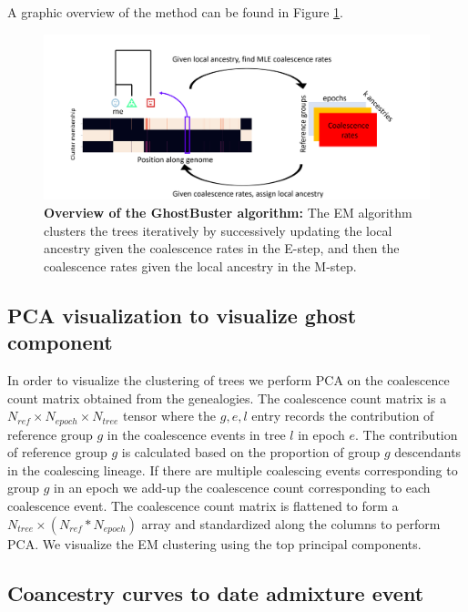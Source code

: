 A graphic overview of the method can be found in Figure \ref{fig:gb_overview}.

\begin{figure}[h!]
    \centering
    \includegraphics[scale=0.5]{figures/ghostbuster_method.PNG}
    \caption{\textbf{Overview of the GhostBuster algorithm: }The EM algorithm clusters the trees iteratively by successively updating the local ancestry given the coalescence rates in the E-step, and then the coalescence rates given the local ancestry in the M-step. }
    \label{fig:gb_overview}
\end{figure}


\subsection{PCA visualization to visualize ghost component}

In order to visualize the clustering of trees we perform PCA on the coalescence count matrix obtained from the genealogies. The coalescence count matrix is a $N_{ref} \times N_{epoch} \times N_{tree}$ tensor where the $g,e,l$ entry records the contribution of reference group $g$ in the coalescence events in tree $l$ in epoch $e$. The contribution of reference group $g$ is calculated based on the proportion of group $g$ descendants in the coalescing lineage. If there are multiple coalescing events corresponding to group $g$ in an epoch we add-up the coalescence count corresponding to each coalescence event. The coalescence count matrix is flattened to form a $N_{tree} \times (N_{ref}*N_{epoch})$ array and standardized along the columns to perform PCA. We visualize the EM clustering using the top principal components.  

\subsection{Coancestry curves to date admixture event}

